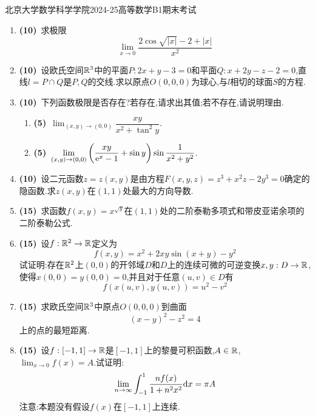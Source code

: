 \documentclass{ctexart}
\begin{document}
\pagestyle{empty}

\begin{center}\Large
    北京大学数学科学学院2024-25高等数学B1期末考试
\end{center}
\begin{enumerate}[leftmargin=*,label=\textbf{\arabic*.}]
    \item \textbf{(10)}\ 求极限\[\lim_{x\to0}\dfrac{2\cos\sqrt{|x|}-2+|x|}{x^2}\]
    \item \textbf{(10)}\ 设欧氏空间$\mathbb{R}^3$中的平面$P:2x+y-3=0$和平面$Q:x+2y-z-2=0$,直线$l=P\cap Q$是$P,Q$的交线.求以原点$O(0,0,0)$为球心,与$l$相切的球面$S$的方程.
    \item \textbf{(10)}\ 下列函数极限是否存在?若存在,请求出其值;若不存在,请说明理由.
        \begin{enumerate}[label=\tbf{(\arabic*)}]
            \item \textbf{(5)}\ \(\displaystyle\lim_{(x,y)\to(0,0)}\dfrac{xy}{x^2+\tan^2y}\).
            \item \textbf{(5)}\ \(\displaystyle\lim_{(x,y)\to(0,0)}\left(\dfrac{xy}{\mathrm{e}^x-1}+\sin y\right)\sin\dfrac{1}{x^2+y^2}\).
        \end{enumerate}
    \item \textbf{(10)}\ 设二元函数$z=z(x,y)$是由方程$F(x,y,z)=z^3+x^2z-2y^3=0$确定的隐函数.求$z(x,y)$在$(1,1)$处最大的方向导数.
    \item \textbf{(15)}\ 求函数$f(x,y)=x^{\sqrt{y}}$在$(1,1)$处的二阶泰勒多项式和带皮亚诺余项的二阶泰勒公式.
    \item \textbf{(15)}\ 设$f:\mathbb{R}^2\to\mathbb{R}$定义为
        \[f(x,y)=x^2+2xy\sin(x+y)-y^2\]
        试证明:存在$\mathbb{R}^2$上$(0,0)$的开邻域$D$和$D$上的连续可微的可逆变换$x,y:D\to\mathbb{R}$,使得$x(0,0)=y(0,0)=0$,并且对于任意$(u,v)\in D$有
        \[f(x(u,v),y(u,v))=u^2-v^2\]
    \item \textbf{(15)}\ 求欧氏空间$\mathbb{R}^3$中原点$O(0,0,0)$到曲面\[(x-y)^2-z^2=4\]上的点的最短距离.
    \item \textbf{(15)}\ 设$f:[-1,1]\to\mathbb{R}$是$[-1,1]$上的黎曼可积函数,$A\in\mathbb{R}$,$\displaystyle\lim_{x\to0}f(x)=A$.试证明:
        \[\lim_{n\to\infty}\int_{-1}^{1}\dfrac{nf(x)}{1+n^2x^2}\mathrm{d} x=\pi A\]
        注意:本题没有假设$f(x)$在$[-1,1]$上连续.
\end{enumerate}
\end{document}
